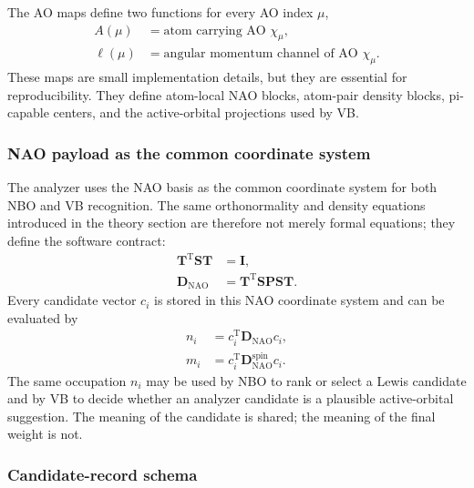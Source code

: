 \documentclass[11pt]{article}
\newcommand{\nao}{\mathrm{NAO}}
\newcommand{\dens}{\mathbf{D}}
\begin{document}
The AO maps define two functions for every AO index $\mu$,
\begin{equation}
\begin{aligned}
	A(\mu) &= \text{atom carrying AO }\chi_\mu, \\
	\ell(\mu) &= \text{angular momentum channel of AO }\chi_\mu.
\end{aligned}
\end{equation}
These maps are small implementation details, but they are essential for reproducibility.  They define atom-local NAO blocks, atom-pair density blocks, pi-capable centers, and the active-orbital projections used by VB.

\subsubsection*{NAO payload as the common coordinate system}

The analyzer uses the NAO basis as the common coordinate system for both NBO and VB recognition.  The same orthonormality and density equations introduced in the theory section are therefore not merely formal equations; they define the software contract:
\begin{equation}
\begin{aligned}
	\mathbf{T}^{\mathrm{T}}\mathbf{S}\mathbf{T} &= \mathbf{I}, \\
	\dens_{\nao} &= \mathbf{T}^{\mathrm{T}}\mathbf{S}\mathbf{P}\mathbf{S}\mathbf{T}.
\end{aligned}
\end{equation}
Every candidate vector $c_i$ is stored in this NAO coordinate system and can be evaluated by
\begin{equation}
\begin{aligned}
	n_i &= c_i^{\mathrm{T}}\dens_{\nao}c_i, \\
	m_i &= c_i^{\mathrm{T}}\dens^{\mathrm{spin}}_{\nao}c_i.
\end{aligned}
\end{equation}
The same occupation $n_i$ may be used by NBO to rank or select a Lewis candidate and by VB to decide whether an analyzer candidate is a plausible active-orbital suggestion.  The meaning of the candidate is shared; the meaning of the final weight is not.

\subsubsection*{Candidate-record schema}
\end{document}
